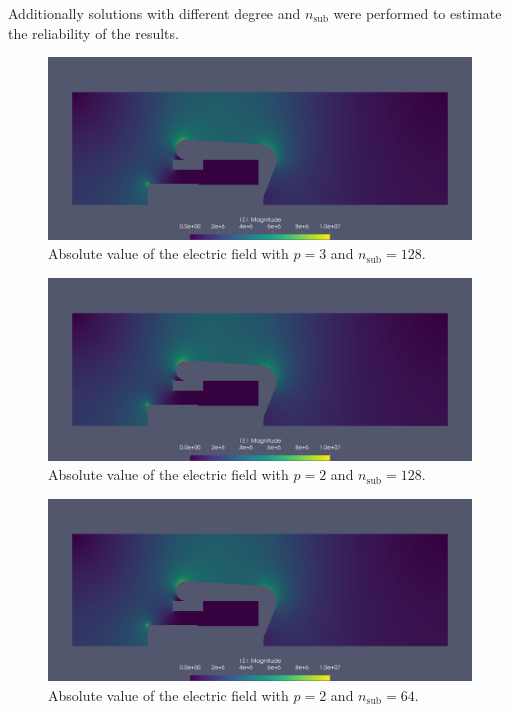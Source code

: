 Additionally solutions with different degree and $n_\mathrm{sub}$ were performed to estimate the reliability of the results.

\begin{center}
\begin{figure}[H]
  \includegraphics[width=\textwidth]{figures/200kV/gradient_degree=3_nsub=128}
  \caption{Absolute value of the electric field with $p=3$ and $n_\mathrm{sub}=128$.}
\end{figure}
\end{center}

\begin{center}
\begin{figure}[H]
  \includegraphics[width=\textwidth]{figures/200kV/gradient_degree=2_nsub=128}
  \caption{Absolute value of the electric field with $p=2$ and $n_\mathrm{sub}=128$.}
\end{figure}
\end{center}

\begin{center}
\begin{figure}[H]
  \includegraphics[width=\textwidth]{figures/200kV/gradient_degree=2_nsub=64}
  \caption{Absolute value of the electric field with $p=2$ and $n_\mathrm{sub}=64$.}
\end{figure}
\end{center}

